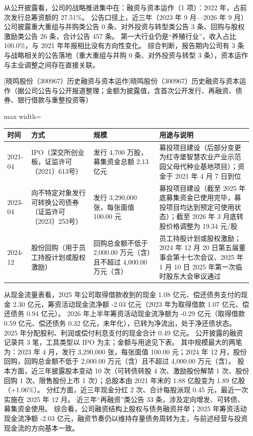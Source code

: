  从公开披露看，公司的战略推进集中在：融资与资本运作（1 项）：2022 年，占前次发行总筹资额的 27.51\%。 公告口径上，近三年（2023 年 9 月---2026 年 9 月）公司披露重大重组与并购类公告 0 条、对外投资与转型类公告 3 条、回购与股权激励类公告 26 条，合计公告 457 条。 第一大行业仍是“养殖行业”，收入占比 100.0\%，与 2021 年年报相比没有方向性变化。 综合判断，报告期内公司有 3 条与战略相关的公告落地（重大重组与并购 0 条、对外投资与转型 3 条），资本运作与主业调整之间存在直接关联。

\begin{center}\small\setlength{\tabcolsep}{4pt}
[晓鸣股份（300967）历史融资与资本运作]{晓鸣股份（300967）历史融资与资本运作（据公司公告与公开报道整理；金额为披露值，含首次公开发行、再融资、债券、银行借款与重整投资等）}
\begin{adjustbox}{max width=\textwidth}
\begin{tabular}{@{}p{1.45cm}p{2.55cm}p{4.05cm}p{4.95cm}@{}}
\toprule
时间 & 方式 & 规模 & 用途与说明 \\
\midrule
2021-04 & IPO（深交所创业板，证监许可〔2021〕613号） & 发行 4,\allowbreak{}700 万股，\allowbreak{}募集资金总额 2.13 亿元 & 募投项目建设（后部分变更为红寺堡智慧农业产业示范园父母代种业基地项目）；资金于 2021 年 4 月 7 日到位 \\
2023-04 & 向不特定对象发行可转换公司债券（证监许可〔2023〕253号） & 发行 3,\allowbreak{}290,\allowbreak{}000 张，\allowbreak{}每张面值 100.00 元 & 募投项目建设（截至 2025 年底募集资金已使用完毕，\allowbreak{}募投项目均达到预定可使用状态）；截至 2026 年 3 月底转股价格调整为 19.34 元/\allowbreak{}股 \\
2024-12 & 股份回购（用于员工持股计划或股权激励） & 回购总金额不低于 2,\allowbreak{}000.00 万元（含）且不超过 4,\allowbreak{}000.00 万元（含） & 员工持股计划或股权激励；2024 年 12 月 20 日第五届董事会第十七次会议、\allowbreak{}2025 年 1 月 10 日 2025 年第一次临时股东大会审议通过 \\
\bottomrule
\end{tabular}
\end{adjustbox}
\end{center}

 从现金流量表看，2025 年公司取得借款收到的现金 1.08 亿元、偿还债务支付的现金 2.30 亿元，筹资活动现金流净额 -2.03 亿元（2023 年为取得借款 1.07 亿元、偿还债务 0.94 亿元）。 2026 年上半年筹资活动现金流净额为 -0.29 亿元（取得借款 0.59 亿元、偿还债务 0.32 亿元，未年化），已转为净流出，处于净还债状态。 2025 年分配股利、利润或偿付利息支付的现金合计 0.49 亿元。 公开披露的融资记录共 3 笔，工具类型以 IPO 为主；金额与用途见下表。 其中规模最大的两笔为：2023 年 4 月，发行 3,290,000 张，每张面值 100.00 元；2024 年 12 月，股份回购，回购总金额不低于 2,000.00 万元（含）且不超过 4,000.00 万元（含）。 股本方面，近三年披露股本变动 10 次（可转债转股 4 次、激励股份解禁 1 次、股份回购 1 次、限售股份上市 1 次）；总股本由 2021 年末的 1.88 亿股变为 1.89 亿股（+1.06\%）。 分红方面，近三年现金分红 2 次、合计每股派现 0.45 元，最近一次实施在 2025 年 12 月。 近三年“再融资”类公告 33 条，涉及定向增发、可转债、募集资金使用。 综合看，公司融资结构上股权与债务融资并举；2025 年筹资活动现金流净额 -2.03 亿元，融资节奏仍以维持存量债务周转为主，与前述经营与投资现金流的方向基本一致。


